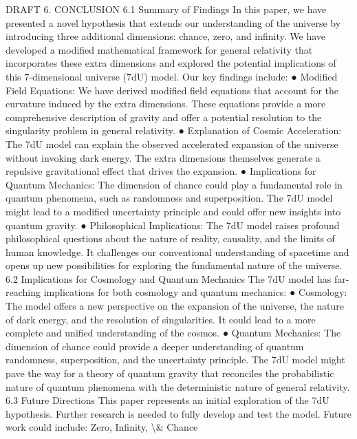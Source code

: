 \documentclass[12pt]{article}
\begin{document}
DRAFT
6. CONCLUSION
6.1 Summary of Findings
In this paper, we have presented a novel hypothesis that extends our understanding of the universe
by introducing three additional dimensions: chance, zero, and inﬁnity. We have developed a
modiﬁed mathematical framework for general relativity that incorporates these extra dimensions
and explored the potential implications of this 7-dimensional universe (7dU) model.
Our key ﬁndings include:
●
Modiﬁed Field Equations: We have derived modiﬁed ﬁeld equations that account for the
curvature induced by the extra dimensions. These equations provide a more comprehensive
description of gravity and oﬀer a potential resolution to the singularity problem in general
relativity.
●
Explanation of Cosmic Acceleration: The 7dU model can explain the observed accelerated
expansion of the universe without invoking dark energy. The extra dimensions themselves
generate a repulsive gravitational eﬀect that drives the expansion.
●
Implications for Quantum Mechanics: The dimension of chance could play a fundamental
role in quantum phenomena, such as randomness and superposition. The 7dU model might
lead to a modiﬁed uncertainty principle and could oﬀer new insights into quantum gravity.
●
Philosophical Implications: The 7dU model raises profound philosophical questions about
the nature of reality, causality, and the limits of human knowledge. It challenges our
conventional understanding of spacetime and opens up new possibilities for exploring the
fundamental nature of the universe.
6.2 Implications for Cosmology and Quantum Mechanics
The 7dU model has far-reaching implications for both cosmology and quantum mechanics:
●
Cosmology: The model oﬀers a new perspective on the expansion of the universe, the
nature of dark energy, and the resolution of singularities. It could lead to a more complete
and uniﬁed understanding of the cosmos.
●
Quantum Mechanics: The dimension of chance could provide a deeper understanding of
quantum randomness, superposition, and the uncertainty principle. The 7dU model might
pave the way for a theory of quantum gravity that reconciles the probabilistic nature of
quantum phenomena with the deterministic nature of general relativity.
6.3 Future Directions
This paper represents an initial exploration of the 7dU hypothesis. Further research is needed to
fully develop and test the model. Future work could include:
Zero, Infinity, \textbackslash{}& Chance
\end{document}
